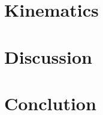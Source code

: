 \documentclass[a4paper,11pt]{article}
\begin{document}
\section{Kinematics}
	\label{sec:kine}

\section{Discussion}
	\label{sec:discuss}

\section{Conclution}
	\label{sec:conc}





{}
\end{document}

